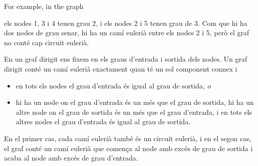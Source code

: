 \begin{samepage}
For example, in the graph
\begin{center}
\end{center}
\end{samepage}
els nodes 1, 3 i 4 tenen grau 2, i els nodes 2 i 5 tenen grau de
3. Com que hi ha dos nodes de grau senar, hi ha un camí eulerià entre
els nodes 2 i 5, però el graf no conté cap circuit eulerià.

En un graf dirigit ens fixem en els graus d'entrada i sortida dels
nodes. Un graf dirigit conté un camí eulerià exactament quan té un sol
component connex i
\begin{itemize}
\item en tots els nodes el grau d'entrada és igual al grau de sortida, \emph{o}
\item hi ha un node on el grau d'entrada és un més que el grau de sortida,
  hi ha un altre node on el grau de sortida és un més que el grau d'entrada,
  i en tots els altres nodes el grau d'entrada és igual al grau de sortida.
\end{itemize}

En el primer cas, cada camí eulerià també és un circuit eulerià, i en
el segon cas, el graf conté un camí eulerià que comença al node amb excés
de grau de sortida i acaba al node amb excés de grau d'entrada.

